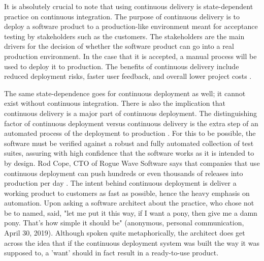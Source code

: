 \documentclass[12pt,a4paper]{article}
\begin{document}
It is absolutely crucial to note that using continuous delivery is state-dependent practice on continuous integration. The purpose of continuous delivery is to deploy a software product to a production-like environment meant for acceptance testing by stakeholders such as the customers. The stakeholders are the main drivers for the decision of whether the software product can go into a real production environment. In the case that it is accepted, a manual process will be used to deploy it to production. The benefits of continuous delivery include reduced deployment risks, faster user feedback, and overall lower project costs \cite[p. ~3910-3911]{shahin_babar_zhu_2017}.

The same state-dependence goes for continuous deployment as well; it cannot exist without continuous integration. There is also the implication that continuous delivery is a major part of continuous deployment. The distinguishing factor of continuous deployment versus continuous delivery is the extra step of an automated process of the deployment to production \cite[p. ~3911]{shahin_babar_zhu_2017}. For this to be possible, the software must be verified against a robust and fully automated collection of test suites, assuring with high confidence that the software works as it is intended to by design. Rod Cope, CTO of Rogue Wave Software says that companies that use continuous deployment can push hundreds or even thousands of releases into production per day \cite{stackify_2018}. The intent behind continuous deployment is deliver a working product to customers as fast as possible, hence the heavy emphasis on automation. Upon asking a software architect about the practice, who chose not be to named, said, "let me put it this way, if I want a pony, then give me a damn pony. That's how simple it should be" (anonymous, personal communication, April 30, 2019). Although spoken quite metaphorically, the architect does get across the idea that if the continuous deployment system was built the way it was supposed to, a 'want' should in fact result in a ready-to-use product.
\end{document}
